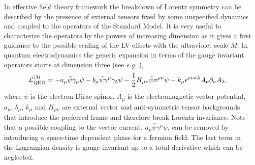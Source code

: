 \documentclass[12pt]{revtex4}
\begin{document}
In effective field theory framework the breakdown of Lorentz 
symmetry can be described by the presence of external tensors fixed 
by some unspecified dynamics and coupled to the operators of the
Standard Model. It is very useful to characterize the operators by the powers 
of increasing dimension as it gives a first guidance to the 
possible scaling of the LV effects with the ultraviolet scale $M$. 
In quantum electrodynamics the generic expansion
in terms of the gauge invariant operators starts at dimension three (see {\em e.g.}
\cite{Kost1}),
\begin{equation}
{\cal L}_{\rm QED}^{(3)} =
-a_\mu \bar \psi \gamma_\mu \psi
- b_\mu \bar \psi \gamma^\mu \gamma_5 \psi - \frac{1}{2}H_{\mu\nu}\bar
\psi \sigma^{\mu\nu} \psi - k_\mu \epsilon^{\mu\nu\kappa\lambda}
A_\nu \partial_\kappa A_\lambda, 
\label{LVqed}
\end{equation}
where $\psi$ is the electron Dirac spinor, $A_\mu$ is the
electromagnetic vector-potential, $a_{\mu}$,
$b_\mu$, $k_\mu$ and $H_{\mu\nu}$ are external vector and
anti-symmetric tensor backgrounds that introduce the preferred
frame and therefore break Lorentz invariance. Note that a possible
coupling to the vector current, $a_\mu \bar \psi \gamma^\mu \psi$,
can be removed by introducing a space-time dependent phase for a
fermion field. The last term in the Lagrangian density is gauge
invariant up to a total derivative which can be neglected. 
\end{document}
